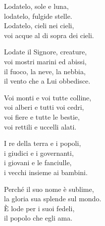 

\spazio

\strofa Lodatelo, sole e luna,\\
lodatelo, fulgide stelle.\\
Lodatelo, cieli nei cieli,\\
voi acque al di sopra dei cieli.

\spazio


\spazio

\strofa Lodate il Signore, creature,\\
voi mostri marini ed abissi,\\
il fuoco, la neve, la nebbia,\\
il vento che a Lui obbedisce.

\spazio


\spazio

\strofa Voi monti e voi tutte colline,\\
voi alberi e tutti voi cedri,\\
voi fiere e tutte le bestie,\\
voi rettili e uccelli alati.

\spazio


\spazio

\strofa I re della terra e i popoli,\\
i giudici e i governanti,\\
i giovani e le fanciulle,\\
i vecchi insieme ai bambini.

\spazio


\spazio

\strofa Perché il suo nome è sublime,\\
la gloria sua splende sul mondo.\\
È lode per i suoi fedeli,\\
il popolo che egli ama.

\spazio

